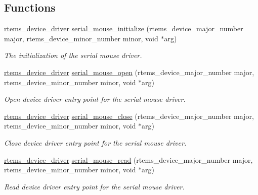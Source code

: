 \subsection*{Functions}
\begin{DoxyCompactItemize}
\item 
\mbox{\hyperlink{group__ClassicStatus_ga545d41846817eaba6143d52ee4d9e9fe}{rtems\+\_\+device\+\_\+driver}} \mbox{\hyperlink{group__libmisc__serialmouse_gab65973e690c31999099201a59b7f3503}{serial\+\_\+mouse\+\_\+initialize}} (rtems\+\_\+device\+\_\+major\+\_\+number major, rtems\+\_\+device\+\_\+minor\+\_\+number minor, void $\ast$arg)
\begin{DoxyCompactList}\small\item\em The initialization of the serial mouse driver. \end{DoxyCompactList}\item 
\mbox{\hyperlink{group__ClassicStatus_ga545d41846817eaba6143d52ee4d9e9fe}{rtems\+\_\+device\+\_\+driver}} \mbox{\hyperlink{group__libmisc__serialmouse_gada12a309a70a5b0b33b6976d874852ee}{serial\+\_\+mouse\+\_\+open}} (rtems\+\_\+device\+\_\+major\+\_\+number major, rtems\+\_\+device\+\_\+minor\+\_\+number minor, void $\ast$arg)
\begin{DoxyCompactList}\small\item\em Open device driver entry point for the serial mouse driver. \end{DoxyCompactList}\item 
\mbox{\hyperlink{group__ClassicStatus_ga545d41846817eaba6143d52ee4d9e9fe}{rtems\+\_\+device\+\_\+driver}} \mbox{\hyperlink{group__libmisc__serialmouse_ga272053b614819188d5f8ca1065942f3d}{serial\+\_\+mouse\+\_\+close}} (rtems\+\_\+device\+\_\+major\+\_\+number major, rtems\+\_\+device\+\_\+minor\+\_\+number minor, void $\ast$arg)
\begin{DoxyCompactList}\small\item\em Close device driver entry point for the serial mouse driver. \end{DoxyCompactList}\item 
\mbox{\hyperlink{group__ClassicStatus_ga545d41846817eaba6143d52ee4d9e9fe}{rtems\+\_\+device\+\_\+driver}} \mbox{\hyperlink{group__libmisc__serialmouse_gab3f97e6962dc3337d13a8ccbdbed8e6d}{serial\+\_\+mouse\+\_\+read}} (rtems\+\_\+device\+\_\+major\+\_\+number major, rtems\+\_\+device\+\_\+minor\+\_\+number minor, void $\ast$arg)
\begin{DoxyCompactList}\small\item\em Read device driver entry point for the serial mouse driver. \end{DoxyCompactList}\item 

\end{DoxyCompactItemize}
